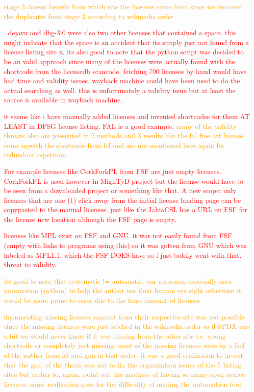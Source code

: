 \textcolor{orange}{stage 3 doesnt benefit from which site the licenses come from since we removed the duplicates from stage 3 according to wikipedia order}

\textcolor{red}{. dejavu and dbg-3.0 were also two other licenses that contained a space. this might indicate that the space is an accident that its simply just not found from a license listing site x. its also good to note that the python script was decided to be an valid approach since many of the licenses were actually found with the shortcode from the licensedb scancode. fetching 700 licenses by hand would have had time and validity issues. wayback machine could have been used to do the actual searching as well. this is unfortunately a validity issue but at least the source is available in wayback machine.}

\textcolor{red}{it seems like i have manually added licenses and invented shortcodes for them AT LEAST in DFSG license listing. FAL is a good example.}
\textcolor{orange}{many of the validity threats also are presented in 2.methods and 3 results like the fal free art license come upwith the shortcode from fsf and are not mentioned here again for redundant repetition.}

\textcolor{red}{For example licenses like CorkForkPL from FSF are just empty licenses. CorkForkPL is used however in MighTyD project but the license would have to be seen from a downloaded project or something like that. A new scope: only licenses that are one (1) click away from the initial license landing page can be copypasted to the manual licenses. just like the JahiaCSL has a URL on FSF for the license new location although the FSF page is empty.}

\textcolor{red}{licenses like MPL exist on FSF and GNU. it was not easily found from FSF (empty with links to programs using this) so it was gotten from GNU which was labeled as MPL1.1, which the FSF DOES have so i just boldly went with that. threat to validity.}

\textcolor{orange}{its good to note that systematic != automatic. our approach especially uses automation (python) to help the author use their human eye sight otherwise it would be more prone to error due to the large amount of licenses}

\textcolor{orange}{documenting missing licenses amount from their respective site was not possible since the missing licenses were just fetched in the wikipedia order so if SPDX was a hit we would never know if it was missing from the other site i.e. wrong shortcode or completely just missing. most of the missing licenses were by a feel of the author from fsf and gnu in that order. it was a good realization to invent that the goal of the thesis was not to fix the organization issues of the 5 listing sites but rather to, again, point out the madness of having so many open source licenses. same realization goes for the difficulity of making the automation tool}

